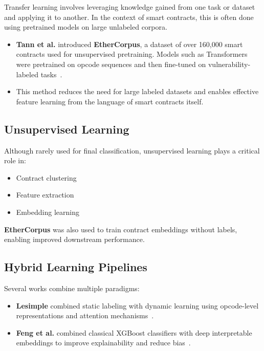 Transfer learning involves leveraging knowledge gained from one task or dataset and applying it to another. In the context of smart contracts, this is often done using pretrained models on large unlabeled corpora.

\begin{itemize}
    \item \textbf{Tann et al.} introduced \textbf{EtherCorpus}, a dataset of over 160,000 smart contracts used for unsupervised pretraining. Models such as Transformers were pretrained on opcode sequences and then fine-tuned on vulnerability-labeled tasks~\cite{tann2020towards}.
    
    \item This method reduces the need for large labeled datasets and enables effective feature learning from the language of smart contracts itself.
\end{itemize}

\subsection*{Unsupervised Learning}

Although rarely used for final classification, unsupervised learning plays a critical role in:
\begin{itemize}
    \item Contract clustering
    \item Feature extraction
    \item Embedding learning
\end{itemize}

\textbf{EtherCorpus} was also used to train contract embeddings without labels, enabling improved downstream performance.

\subsection*{Hybrid Learning Pipelines}

Several works combine multiple paradigms:

\begin{itemize}
    \item \textbf{Lesimple} combined static labeling with dynamic learning using opcode-level representations and attention mechanisms~\cite{lesimple2020master}.
    
    \item \textbf{Feng et al.} combined classical XGBoost classifiers with deep interpretable embeddings to improve explainability and reduce bias~\cite{feng2024interpretable}.
\end{itemize}

